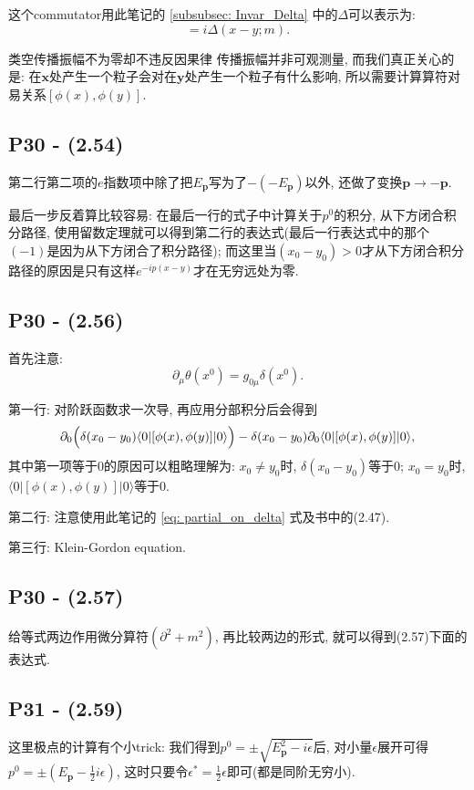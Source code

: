 这个commutator用此笔记的 \ref{subsubsec: Invar_Delta} 中的$\Delta$可以表示为:
\begin{equation}
  [\phi(x), \phi(y)] = i\Delta(x-y; m).
\end{equation}

\begin{mybox}{类空传播振幅不为零却不违反因果律}
  传播振幅并非可观测量, 而我们真正关心的是: 在$\mathbf{x}$处产生一个粒子会对在$\mathbf{y}$处产生一个粒子有什么影响, 所以需要计算算符对易关系$[\phi(x), \phi(y)]$.
\end{mybox}

\subsection{P30 - (2.54)}

第二行第二项的$e$指数项中除了把$E_\mathbf{p}$写为了$-(-E_\mathbf{p})$以外, 还做了变换$\mathbf{p} \rightarrow -\mathbf{p}$.

最后一步反着算比较容易: 在最后一行的式子中计算关于$p^0$的积分, 从下方闭合积分路径, 使用留数定理就可以得到第二行的表达式(最后一行表达式中的那个$(-1)$是因为从下方闭合了积分路径); 而这里当$(x_0 - y_0)>0$才从下方闭合积分路径的原因是只有这样$e^{-ip(x - y)}$才在无穷远处为零.

\subsection{P30 - (2.56)}

首先注意:
\begin{equation}
  \partial_\mu \theta(x^0) = g_{0\mu} \delta(x^0) \label{eq: partial_on_delta}.
\end{equation}

第一行: 对阶跃函数求一次导, 再应用分部积分后会得到
\begin{equation}
  \partial_0 \Bigl(\delta(x_0 - y_0)\langle 0|[\phi(x), \phi(y)]|0\rangle \Bigr)-\delta(x_0 - y_0)\partial_0\langle 0|[\phi(x), \phi(y)]|0\rangle,
\end{equation}
其中第一项等于0的原因可以粗略理解为: $x_0 \neq y_0$时, $\delta(x_0 - y_0)$等于0; $x_0 = y_0$时, $\langle 0|[\phi(x), \phi(y)]|0\rangle$等于0.

第二行: 注意使用此笔记的 \eqref{eq: partial_on_delta} 式及书中的(2.47).

第三行: Klein-Gordon equation.

\subsection{P30 - (2.57)}

给等式两边作用微分算符$(\partial^2 + m^2)$, 再比较两边的形式, 就可以得到(2.57)下面的表达式.

\subsection{P31 - (2.59)}

这里极点的计算有个小trick: 我们得到$p^0 = \pm\sqrt{E_\mathbf{p}^2 - i\epsilon}$后, 对小量$\epsilon$展开可得$p^0 = \pm (E_\mathbf{p} - \frac{1}{2}i\epsilon)$, 这时只要令$\epsilon^* = \frac{1}{2}\epsilon$即可(都是同阶无穷小).
